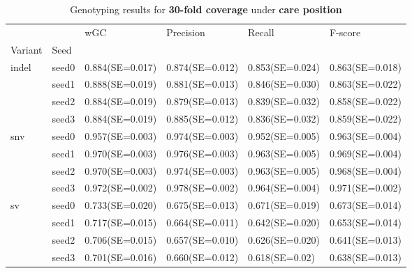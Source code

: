 \documentclass{PHlab-thesis}
\begin{document}
\begin{table}[ht!]
\begin{tabular*}{\textwidth}{@{\extracolsep{\fill}}llllll@{\extracolsep{\fill}}}
\toprule
   &         &               wGC &         Precision &            Recall &           F-score \\
Variant & Seed &                   &                   &                   &                   \\
\midrule
indel & seed0  & 0.884(SE=0.017)&0.874(SE=0.012)&  0.853(SE=0.024)&  0.863(SE=0.018) \\
   & seed1 &0.888(SE=0.019)&  0.881(SE=0.013)&  0.846(SE=0.030)&  0.863(SE=0.022)\\
   & seed2 & 0.884(SE=0.019)&  0.879(SE=0.013)&  0.839(SE=0.032)&  0.858(SE=0.022)\\
   & seed3 & 0.884(SE=0.019)&  0.885(SE=0.012)&  0.836(SE=0.032) & 0.859(SE=0.022)\\
   
\midrule
snv & seed0 & 0.957(SE=0.003)&  0.974(SE=0.003)&  0.952(SE=0.005)&  0.963(SE=0.004)\\
   & seed1 & 0.970(SE=0.003)&  0.976(SE=0.003)&  0.963(SE=0.005)&  0.969(SE=0.004)\\
   & seed2 & 0.970(SE=0.003)&  0.974(SE=0.003)&  0.963(SE=0.005)&  0.968(SE=0.004)\\
   & seed3 & 0.972(SE=0.002) &0.978(SE=0.002)&0.964(SE=0.004)& 0.971(SE=0.002)\\
  
\midrule
sv & seed0  & 0.733(SE=0.020)&  0.675(SE=0.013)&  0.671(SE=0.019)&  0.673(SE=0.014) \\
   & seed1 & 0.717(SE=0.015)&  0.664(SE=0.011)&  0.642(SE=0.020)&  0.653(SE=0.014)\\
   & seed2 & 0.706(SE=0.015)&  0.657(SE=0.010)&  0.626(SE=0.020)&  0.641(SE=0.013)\\
   & seed3 & 0.701(SE=0.016)&0.660(SE=0.012)&0.618(SE=0.02)&0.638(SE=0.013)\\
   
\bottomrule
\end{tabular*}
\caption{Genotyping results for \textbf{30-fold coverage } under \textbf{care position}\label{table:care-30x}}
\end{table}
\end{document}
